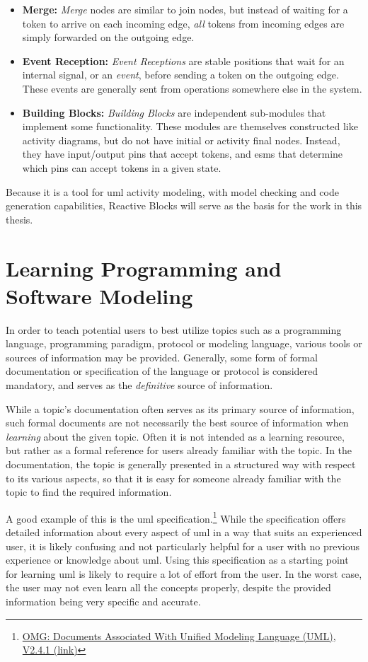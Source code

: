 \begin{itemize}
	\item{\textbf{Merge:}} \emph{Merge} nodes are similar to join nodes, but instead of waiting for a token to arrive on each incoming edge, \emph{all} tokens from incoming edges are simply forwarded on the outgoing edge.
	\item{\textbf{Event Reception:}} \emph{Event Receptions} are stable positions that wait for an internal signal, or an \emph{event}, before sending a token on the outgoing edge. These events are generally sent from operations somewhere else in the system.
	\item{\textbf{Building Blocks:}} \emph{Building Blocks} are independent sub-modules that implement some functionality. These modules are themselves constructed like activity diagrams, but do not have initial or activity final nodes. Instead, they have input/output pins that accept tokens, and \glspl{esm} that determine which pins can accept tokens in a given state. 
\end{itemize}

\noindent
Because it is a tool for \gls{uml} activity modeling, with model checking and code generation capabilities, Reactive Blocks will serve as the basis for the work in this thesis.

\section{Learning Programming and Software Modeling}
\label{sec:learning_programming}
In order to teach potential users to best utilize topics such as a programming language, programming paradigm, protocol or modeling language, various tools or sources of information may be provided. Generally, some form of formal documentation or specification of the language or protocol is considered mandatory, and serves as the \emph{definitive} source of information.

\noindent
While a topic's documentation often serves as its primary source of information, such formal documents are not necessarily the best source of information when \emph{learning} about the given topic. Often it is not intended as a learning resource, but rather as a formal reference for users already familiar with the topic. In the documentation, the topic is generally presented in a structured way with respect to its various aspects, so that it is easy for someone already familiar with the topic to find the required information.

\noindent
A good example of this is the \gls{uml} specification.\footnote{\href{http://www.omg.org/spec/UML/2.4.1/}{OMG: Documents Associated With Unified Modeling Language (UML), V2.4.1 (link)}} While the specification offers detailed information about every aspect of \gls{uml} in a way that suits an experienced user, it is likely confusing and not particularly helpful for a user with no previous experience or knowledge about \gls{uml}. Using this specification as a starting point for learning \gls{uml} is likely to require a lot of effort from the user. In the worst case, the user may not even learn all the concepts properly, despite the provided information being very specific and accurate.

